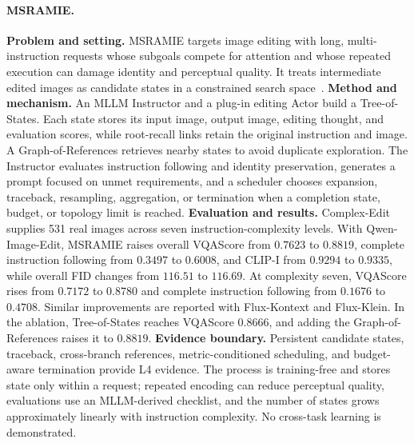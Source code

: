 \paragraph{MSRAMIE.}
\textbf{Problem and setting.} MSRAMIE targets image editing with long, multi-instruction requests whose subgoals compete for attention and whose repeated execution can damage identity and perceptual quality. It treats intermediate edited images as candidate states in a constrained search space~\cite{avg260316967}. \textbf{Method and mechanism.} An MLLM Instructor and a plug-in editing Actor build a Tree-of-States. Each state stores its input image, output image, editing thought, and evaluation scores, while root-recall links retain the original instruction and image. A Graph-of-References retrieves nearby states to avoid duplicate exploration. The Instructor evaluates instruction following and identity preservation, generates a prompt focused on unmet requirements, and a scheduler chooses expansion, traceback, resampling, aggregation, or termination when a completion state, budget, or topology limit is reached. \textbf{Evaluation and results.} Complex-Edit supplies 531 real images across seven instruction-complexity levels. With Qwen-Image-Edit, MSRAMIE raises overall VQAScore from $0.7623$ to $0.8819$, complete instruction following from $0.3497$ to $0.6008$, and CLIP-I from $0.9294$ to $0.9335$, while overall FID changes from $116.51$ to $116.69$. At complexity seven, VQAScore rises from $0.7172$ to $0.8780$ and complete instruction following from $0.1676$ to $0.4708$. Similar improvements are reported with Flux-Kontext and Flux-Klein. In the ablation, Tree-of-States reaches VQAScore $0.8666$, and adding the Graph-of-References raises it to $0.8819$. \textbf{Evidence boundary.} Persistent candidate states, traceback, cross-branch references, metric-conditioned scheduling, and budget-aware termination provide L4 evidence. The process is training-free and stores state only within a request; repeated encoding can reduce perceptual quality, evaluations use an MLLM-derived checklist, and the number of states grows approximately linearly with instruction complexity. No cross-task learning is demonstrated.

